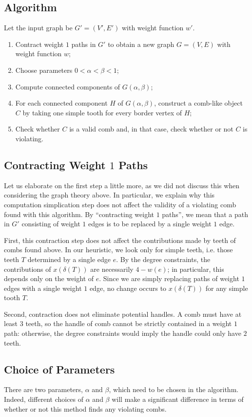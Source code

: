 \documentclass[11pt, letterpaper]{amsart}
\theoremstyle{plain}
\theoremstyle{definition}
\theoremstyle{remark}
\begin{document}
\subsection{Algorithm}
Let the input graph be $G' = (V',E')$ with weight function $w'$.
\begin{enumerate}
  \item Contract weight $1$ paths in $G'$ to obtain a new graph $G = (V,E)$
    with weight function $w$;
  \item Choose parameters $0 < \alpha < \beta < 1$;
  \item Compute connected components of $G(\alpha,\beta)$;
  \item For each connected component $H$ of $G(\alpha,\beta)$, construct a comb-like
    object $C$ by taking one simple tooth for every border vertex of $H$;
  \item Check whether $C$ is a valid comb and, in that case, check whether or not
    $C$ is violating.
\end{enumerate}

\subsection{Contracting Weight $1$ Paths}
Let us elaborate on the first step a little more, as we did not discuss this
when considering the graph theory above. In particular, we explain why this
computation simplication step does not affect the validity of a violating comb
found with this algorithm.  By ``contracting weight $1$ paths'', we mean that a
path in $G'$ consisting of weight $1$ edges is to be replaced by a single
weight $1$ edge.

First, this contraction step does not affect the contributions made by teeth of
combs found above. In our heuristic, we look only for simple teeth, i.e. those
teeth $T$ determined by a single edge $e$. By the degree constraints, the
contributions of $x(\delta(T))$ are necessarily $4 - w(e)$; in particular, this
depends only on the weight of $e$. Since we are simply replacing paths of
weight $1$ edges with a single weight $1$ edge, no change occurs to
$x(\delta(T))$ for any simple tooth $T$.

Second, contraction does not eliminate potential handles. A comb must have at
least $3$ teeth, so the handle of comb cannot be strictly contained in a weight
$1$ path: otherwise, the degree constraints would imply the handle could only
have $2$ teeth.

\subsection{Choice of Parameters}
There are two parameters, $\alpha$ and $\beta$, which need to be chosen in the
algorithm. Indeed, different choices of $\alpha$ and $\beta$ will make a
significant difference in terms of whether or not this method finds any
violating combs.

\end{document}
